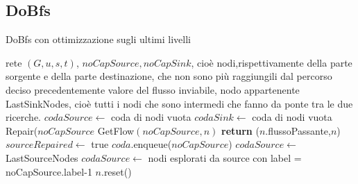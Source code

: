 \documentclass{article}
\begin{document}
\subsection{DoBfs}
\begin{algorithm}
    \caption{DoBfs con ottimizzazione sugli ultimi livelli}
    \begin{algorithmic}[1]
        \REQUIRE rete $(G,u,s,t)$, $noCapSource, noCapSink$, cioè nodi,rispettivamente della parte sorgente e della parte destinazione, che non sono più raggiungili dal percorso deciso precedentemente
        \ENSURE valore del flusso inviabile, nodo appartenente LastSinkNodes, cioè tutti i nodi che sono intermedi che fanno da ponte tra le due ricerche.
        \STATE $codaSource \leftarrow$ coda di nodi vuota
        \STATE $codaSink \leftarrow$ coda di nodi vuota
        \STATE Repair($noCapSource$
        \STATE GetFlow$(noCapSource,n)$ 
        \STATE \textbf{return} ($n$.flussoPassante,$n$)
        \ENDIF
        \ENDFOR
        \ELSE
        \STATE $sourceRepaired \leftarrow$ true
        \ENDIF
        \ENDIF
        \STATE $coda.$enqueue($noCapSource$)
        \STATE $codaSource \leftarrow$ LastSourceNodes 
        \ELSE
        \STATE $codaSource \leftarrow$ nodi esplorati da source con label = noCapSource.label-1
        \STATE $n.$reset()
        \ENDFOR
        \ENDIF
        \ENDIF

    \end{algorithmic}
\end{algorithm}

\newpage
\end{document}
